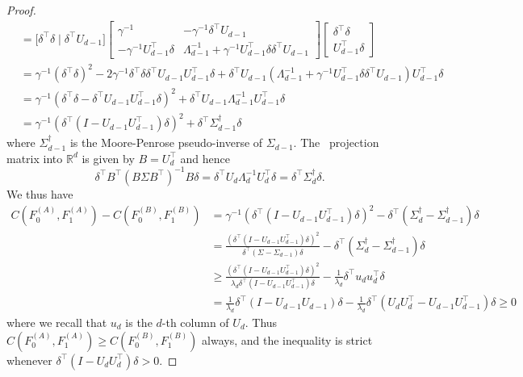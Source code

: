 \documentclass[11pt]{extarticle}
\begin{document}
\begin{proof}
\begin{equation*}
\begin{split}
 &= \bigl[\delta^{\top} \delta \mid \delta^{\top} U_{d-1} \bigr] \begin{bmatrix} \gamma^{-1} & - \gamma^{-1} \delta^{\top} U_{d-1} \\ - \gamma^{-1} U_{d-1}^{\top} \delta & \Lambda_{d-1}^{-1} + \gamma^{-1}  U_{d-1}^{\top} \delta \delta^{\top} U_{d-1} \end{bmatrix} \begin{bmatrix} \delta^{\top} \delta \\ U_{d-1}^{\top} \delta \end{bmatrix} \\
 &= \gamma^{-1} (\delta^{\top} \delta)^{2} - 2 \gamma^{-1} \delta^{\top} \delta \delta^{\top} U_{d-1} U_{d-1}^{\top} \delta + \delta^{\top} U_{d-1} (\Lambda_{d-1}^{-1} + \gamma^{-1} U_{d-1}^{\top} \delta \delta^{\top} U_{d-1}) U_{d-1}^{\top} \delta \\
 &= \gamma^{-1} (\delta^{\top} \delta - \delta^{\top} U_{d-1} U_{d-1}^{\top} \delta)^{2} + \delta^{\top} U_{d-1} \Lambda_{d-1}^{-1} U_{d-1}^{\top} \delta \\
 &= \gamma^{-1} (\delta^{\top} (I - U_{d-1} U_{d-1}^{\top}) \delta)^{2} + \delta^{\top} \Sigma_{d-1}^{\dagger} \delta
 \end{split}
 \end{equation*}
 where $\Sigma_{d-1}^{\dagger}$ is the Moore-Penrose pseudo-inverse of $\Sigma_{d-1}$. The \Lda~projection matrix into $\mathbb{R}^{d}$ is given by $B = U_{d}^{\top}$ and hence
 \begin{equation}
 \delta^{\top} B^{\top} (B \Sigma B^{\top})^{-1} B \delta = \delta^{\top} U_{d} \Lambda_d^{-1} U_d^{\top} \delta = \delta^{\top} \Sigma_{d}^{\dagger} \delta.
 \end{equation}
 We thus have
\begin{equation*}
\begin{split}
C(F_0^{(A)}, F_1^{(A)}) - C(F_0^{(B)}, F_1^{(B)}) &= \gamma^{-1} (\delta^{\top} (I - U_{d-1} U_{d-1}^{\top}) \delta)^{2} - \delta^{\top} (\Sigma_{d}^{\dagger} - \Sigma_{d-1}^{\dagger}) \delta \\ &= \frac{(\delta^{\top} (I - U_{d-1} U_{d-1}^{\top}) \delta)^{2}}{\delta^{\top} (\Sigma - \Sigma_{d-1}) \delta} - \delta^{\top} (\Sigma_{d}^{\dagger} - \Sigma_{d-1}^{\dagger}) \delta \\ &
\geq \frac{(\delta^{\top} (I - U_{d-1} U_{d-1}^{\top}) \delta)^{2}}{\lambda_d \delta^{\top} (I - U_{d-1}U_{d-1}^{\top}) \delta} - \frac{1}{\lambda_{d}} \delta^{\top} u_{d} u_{d}^{\top} \delta
\\ &= \frac{1}{\lambda_d} \delta^{\top} (I - U_{d-1}U_{d-1}) \delta - \frac{1}{\lambda_d} \delta^{\top} (U_{d} U_{d}^{\top} - U_{d-1} U_{d-1}^{\top}) \delta \geq 0
\end{split}
\end{equation*}
where we recall that $u_{d}$ is the $d$-th column of $U_{d}$. Thus $C(F_0^{(A)}, F_1^{(A)}) \geq C(F_0^{(B)}, F_1^{(B)})$ always, and the inequality is strict whenever $\delta^{\top} (I - U_{d} U_{d}^{\top}) \delta > 0$.
\end{proof}
\end{document}

